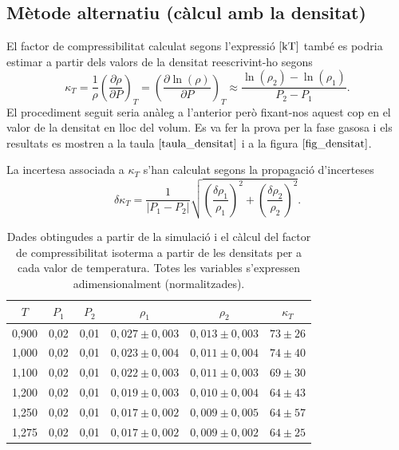 \documentclass[a4paper,10.5pt]{report}
\begin{document}
\subsection{Mètode alternatiu (càlcul amb la densitat)}
El factor de compressibilitat calculat segons l'expressió $\eqref{kT}$ també es podria estimar a partir dels valors de la densitat reescrivint-ho segons
\begin{equation}
	\kappa_T=\frac{1}{\rho}\left(\frac{\partial\rho}{\partial P}\right)_T = \left(\frac{\partial\ln(\rho)}{\partial P}\right)_T \approx \frac{\ln(\rho_2) - \ln(\rho_1)}{P_2 - P_1}.
\end{equation}
El procediment seguit seria anàleg a l'anterior però fixant-nos aquest cop en el valor de la densitat en lloc del volum. Es va fer la prova per la fase gasosa i els resultats es mostren a la taula $\ref{taula_densitat}$ i a la figura $\ref{fig_densitat}$.

La incertesa associada a $\kappa_T$ s'han calculat segons la propagació d'incerteses
\begin{equation}
	\delta \kappa_T = \frac{1}{|P_1 - P_2|} \sqrt{\left(\frac{\delta \rho_1}{\rho_1}\right)^2 + \left(\frac{\delta \rho_2}{\rho_2}\right)^2}.
\end{equation}

\begin{table}[h]
	\centering
	\caption{Dades obtingudes a partir de la simulació i el càlcul del factor de compressibilitat isoterma a partir de les densitats per a cada valor de temperatura. Totes les variables s'expressen adimensionalment (normalitzades).}
	\label{taula_densitat}
	\begin{tabular}{cccccc}
		\toprule
		$T$ & $P_1$ & $P_2$ & $\rho_1$ & $\rho_2$ & $\kappa_T$ \\ 
		\midrule
		0,900 & 0,02 & 0,01 & $0,027 \pm 0,003$ & $0,013 \pm 0,003$ & $73 \pm 26$ \\
		1,000 & 0,02 & 0,01 & $0,023 \pm 0,004$ & $0,011 \pm 0,004$ & $74 \pm 40$ \\
		1,100 & 0,02 & 0,01 & $0,022 \pm 0,003$ & $0,011 \pm 0,003$ & $69 \pm 30$ \\
		1,200 & 0,02 & 0,01 & $0,019 \pm 0,003$ & $0,010 \pm 0,004$ & $64 \pm 43$ \\
		1,250 & 0,02 & 0,01 & $0,017 \pm 0,002$ & $0,009 \pm 0,005$ & $64 \pm 57$ \\
		1,275 & 0,02 & 0,01 & $0,017 \pm 0,002$ & $0,009 \pm 0,002$ & $64 \pm 25$ \\ 
		\bottomrule
	\end{tabular}
\end{table}
\end{document}
